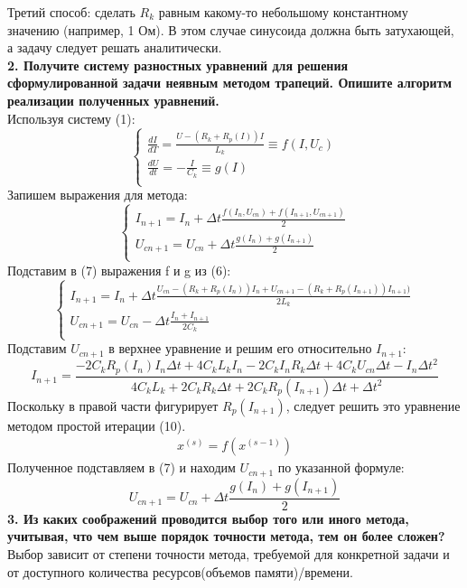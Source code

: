 Третий способ: сделать $R_k$ равным какому-то небольшому константному значению (например, 1 Ом). В этом случае синусоида должна быть затухающей, а задачу следует решать аналитически.\\
\textbf{2. Получите систему разностных уравнений для решения сформулированной задачи неявным методом трапеций. Опишите алгоритм реализации полученных уравнений.}\\
Используя систему (1):
\begin{equation}
\begin{cases}
\frac{dI}{dT} = \frac{U - (R_k + R_p(I))I}{L_k} \equiv f(I, U_c)\\
\frac{dU}{dt} = -\frac{I}{C_k} 	\equiv g(I)\\
\end{cases}
\end{equation}
Запишем выражения для метода:
\begin{equation}
\begin{cases}
I_{n+1}=I_n + \Delta t \frac{f(I_n,U_{cn})+f(I_{n+1},U_{cn+1})}{2}\\
U_{cn+1}= U_{cn}+\Delta t \frac{g(I_n) + g(I_{n+1})}{2}\\
\end{cases}
\end{equation}
Подставим в (7) выражения f и g из (6):
\begin{equation}
\begin{cases}
	I_{n+1}=I_n + \Delta t \frac{U_{cn}-(R_k +R_p(I_n))I_n+U_{cn+1}-(R_k+R_p(I_{n+1}))I_{n+1})}{2L_k}\\
	U_{cn+1}= U_{cn}-\Delta t \frac{I_n + I_{n+1}}{2C_k}\\
\end{cases}
\end{equation}
Подставим $U_{cn+1}$ в верхнее уравнение и решим его относительно $I_{n+1}$:
\begin{equation}
I_{n+1}=\frac{-2C_kR_p(I_n)I_n\Delta t + 4C_kL_kI_n-2C_kI_nR_k\Delta t+4C_kU_{cn}\Delta t - I_n\Delta t^2}{4C_kL_k + 2C_kR_k\Delta t + 2 C_kR_p(I_{n+1})\Delta t+ \Delta t^2}
\end{equation}
Поскольку в правой части фигурирует $R_p(I_{n+1})$, следует решить это уравнение методом простой итерации (10).
\begin{eqnarray}
x^{(s)}=f(x^{(s-1)})
\end{eqnarray}
Полученное подставляем в (7) и находим $U_{cn+1}$ по указанной формуле:
\begin{equation}
U_{cn+1}= U_{cn}+\Delta t \frac{g(I_n) + g(I_{n+1})}{2}
\end{equation}
\textbf{3. Из каких соображений проводится выбор того или иного метода, учитывая, что чем выше порядок точности метода, тем он более сложен?}\\
Выбор зависит от степени точности метода, требуемой для конкретной задачи и от доступного количества ресурсов(объемов памяти)/времени.


